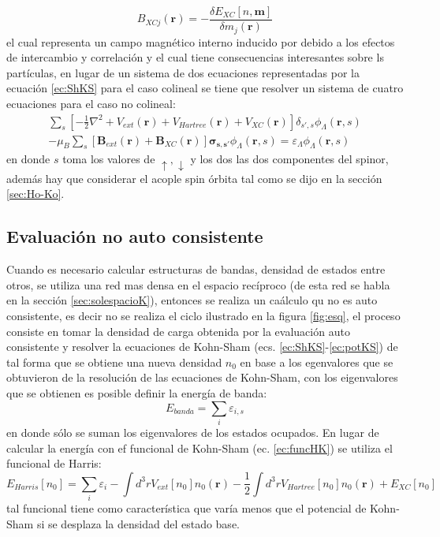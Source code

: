 \documentclass[12pt,a4paper, oneside]{book}
\begin{document}
   \begin{equation*}
   B_{XCj} (\pmb{r}) = - \frac{\delta E_{XC} [n,\pmb{m}]}{\delta m_j (\pmb{r})}
   \end{equation*}
   el cual representa un campo magn\'etico interno inducido por  debido a los efectos de intercambio y correlaci\'on y el cual tiene consecuencias interesantes sobre ls part\'iculas, en lugar de un sistema de dos ecuaciones representadas por la ecuaci\'on \ref{ec:ShKS} para el caso colineal se tiene que resolver un sistema de cuatro ecuaciones para el caso no colineal:
   \begin{multline}
   \sum_{s}  \left[-\frac{1}{2} \nabla^2 + V_{ext} (\pmb{r})+ V_{Hartree} (\pmb{r}) + V_{XC} (\pmb{r}) \right] \delta_{s',s}  \phi_{\Lambda} (\pmb{r},s)\\ - \mu_{B} \sum_{s}  [\pmb{B}_{ext} (\pmb{r})+ \pmb{B}_{XC} (\pmb{r}) ] \pmb{\sigma_{s,s'}} \phi_{\Lambda} (\pmb{r},s) = \varepsilon_{\Lambda} \phi_{\Lambda} (\pmb{r},s) \label{ec:KSnoColl}
   \end{multline}
   en donde $s$ toma los valores de $\uparrow, \downarrow$ y los dos las dos componentes del spinor, adem\'as hay que considerar el acople spin \'orbita tal como se dijo en la secci\'on \ref{sec:Ho-Ko}.
   \subsection{Evaluaci\'on no auto consistente}
   Cuando es necesario calcular estructuras de bandas,  densidad de estados entre otros, se utiliza una red mas densa en el espacio rec\'iproco (de esta red se habla en la secci\'on \ref{sec:solespacioK}), entonces se realiza un ca\'alculo qu no es auto consistente, es decir no se realiza el ciclo ilustrado en la figura \ref{fig:esq}, el proceso consiste en tomar la densidad de carga obtenida por la evaluaci\'on auto consistente  y resolver la ecuaciones de Kohn-Sham (ecs. \ref{ec:ShKS}-\ref{ec:potKS}) de tal forma que se obtiene una nueva densidad $n_0$ en base a los egenvalores que se obtuvieron de la resoluci\'on  de las ecuaciones de Kohn-Sham, con los eigenvalores que se obtienen es posible definir la energ\'ia de banda:
   \begin{equation}
   E_{banda} = \sum_{i} \varepsilon_{i,s} \label{ec:Eband}
   \end{equation}
   en donde s\'olo se suman los eigenvalores de los estados ocupados. En lugar de calcular la energ\'ia con ef funcional de Kohn-Sham (ec. \ref{ec:funcHK}) se utiliza el funcional de Harris:
   \begin{equation}
   E_{Harris} [n_0] = \sum_{i} \varepsilon_i - \int d^3 r V_{ext} [n_0] n_0 (\pmb{r}) - \frac{1}{2} \int d^3 r V_{Hartree} [n_0] n_0 (\pmb{r}) + E_{XC} [n_0] \label{ec:FuncHarris}
   \end{equation} 
   tal funcional tiene como caracter\'istica que var\'ia menos que el potencial de Kohn-Sham si se desplaza la densidad del estado base.
\end{document}
